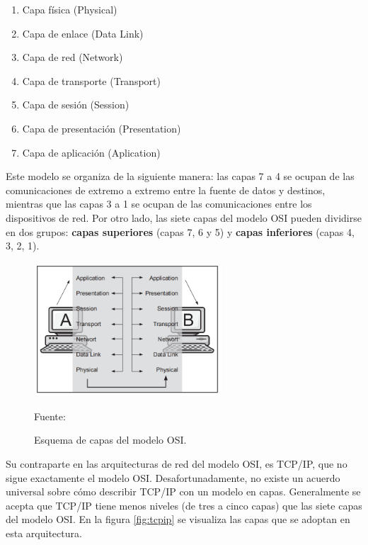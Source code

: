 \begin{enumerate}
    \item Capa física (Physical)
    \item Capa de enlace (Data Link)
    \item Capa de red (Network)
    \item Capa de transporte (Transport)
    \item Capa de sesión (Session)
    \item Capa de presentación (Presentation)
    \item Capa de aplicación (Aplication)
\end{enumerate}

Este modelo se organiza de la siguiente manera: las capas 7 a 4 se ocupan de las comunicaciones de extremo a extremo entre la fuente de datos y destinos, mientras que las capas 3 a 1 se ocupan de las comunicaciones entre los dispositivos de red. Por otro lado, las siete capas del modelo OSI pueden dividirse en dos grupos: \textbf{capas superiores} (capas 7, 6 y 5) y \textbf{capas inferiores} (capas 4, 3, 2, 1).\\

\begin{figure}[H]
    \begin{center}
        \includegraphics[width=7cm]{img/capitulo_2/capas.png}
        \caption{Esquema de capas del modelo OSI.\\}
        Fuente: \protect\cite[3]{networkProtocolos:handbook}
        \label{fig:osi}
    \end{center}
\end{figure}

Su contraparte en las arquitecturas de red del modelo OSI, es TCP/IP, que no sigue exactamente el modelo OSI. Desafortunadamente, no existe un acuerdo universal sobre cómo describir TCP/IP con un modelo en capas. Generalmente se acepta que TCP/IP tiene menos niveles (de tres a cinco capas) que las siete capas del modelo OSI. En la figura \ref{fig:tcpip} se visualiza las capas que se adoptan en esta arquitectura. 

